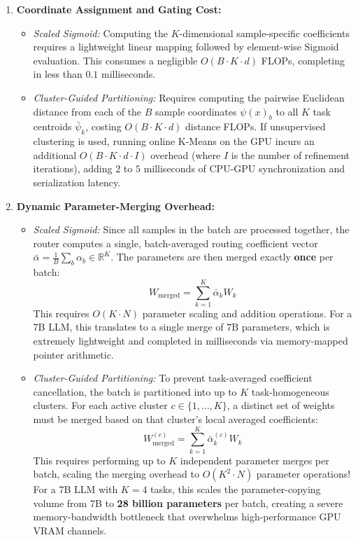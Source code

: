 \begin{enumerate}
    \item \textbf{Coordinate Assignment and Gating Cost:}
    \begin{itemize}
        \item \emph{Scaled Sigmoid:} Computing the $K$-dimensional sample-specific coefficients
requires a lightweight linear mapping followed by element-wise Sigmoid evaluation. This consumes a
negligible $O(B \cdot K \cdot d)$ FLOPs, completing in less than $0.1$ milliseconds.
        \item \emph{Cluster-Guided Partitioning:} Requires computing the pairwise Euclidean
distance from each of the $B$ sample coordinates $\psi(x)_b$ to all $K$ task centroids
$\bar{\psi}_k$, costing $O(B \cdot K \cdot d)$ distance FLOPs. If unsupervised clustering is used,
running online K-Means on the GPU incurs an additional $O(B \cdot K \cdot d \cdot I)$ overhead
(where $I$ is the number of refinement iterations), adding $2$ to $5$ milliseconds of CPU-GPU
synchronization and serialization latency.
    \end{itemize}
    
    \item \textbf{Dynamic Parameter-Merging Overhead:}
    \begin{itemize}
        \item \emph{Scaled Sigmoid:} Since all samples in the batch are processed together, the
router computes a single, batch-averaged routing coefficient vector $\bar{\alpha} = \frac{1}{B}
\sum_b \alpha_b \in \mathbb{R}^K$. The parameters are then merged exactly \textbf{once} per batch:
        \begin{equation}
        W_{\text{merged}} = \sum_{k=1}^K \bar{\alpha}_k W_k
        \end{equation}
        This requires $O(K \cdot N)$ parameter scaling and addition operations. For a 7B LLM, this
translates to a single merge of $7\text{B}$ parameters, which is extremely lightweight and completed
in milliseconds via memory-mapped pointer arithmetic.
        \item \emph{Cluster-Guided Partitioning:} To prevent task-averaged coefficient
cancellation, the batch is partitioned into up to $K$ task-homogeneous clusters. For each active
cluster $c \in \{1, \dots, K\}$, a distinct set of weights must be merged based on that cluster's
local averaged coefficients:
        \begin{equation}
        W_{\text{merged}}^{(c)} = \sum_{k=1}^K \bar{\alpha}_k^{(c)} W_k
        \end{equation}
        This requires performing up to $K$ independent parameter merges per batch, scaling the
merging overhead to $O(K^2 \cdot N)$ parameter operations! For a 7B LLM with $K=4$ tasks, this
scales the parameter-copying volume from 7B to \textbf{28 billion parameters} per batch, creating a
severe memory-bandwidth bottleneck that overwhelms high-performance GPU VRAM channels.
    \end{itemize}
    

\end{enumerate}
